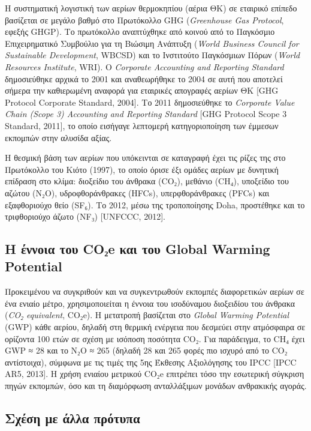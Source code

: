 Η συστηματική λογιστική των αερίων θερμοκηπίου (αέρια ΘΚ) σε εταιρικό
επίπεδο βασίζεται σε μεγάλο βαθμό στο Πρωτόκολλο GHG (\emph{Greenhouse
Gas Protocol}, εφεξής GHGP). Το πρωτόκολλο αναπτύχθηκε από κοινού από το
Παγκόσμιο Επιχειρηματικό Συμβούλιο για τη Βιώσιμη Ανάπτυξη (\emph{World
Business Council for Sustainable Development}, WBCSD) και το Ινστιτούτο
Παγκόσμιων Πόρων (\emph{World Resources Institute}, WRI). Ο
\emph{Corporate Accounting and Reporting Standard} δημοσιεύθηκε αρχικά
το 2001 και αναθεωρήθηκε το 2004 σε αυτή που αποτελεί σήμερα την
καθιερωμένη αναφορά για εταιρικές απογραφές αερίων ΘΚ {[}GHG Protocol
Corporate Standard, 2004{]}. Το 2011 δημοσιεύθηκε το \emph{Corporate
Value Chain (Scope 3) Accounting and Reporting Standard} {[}GHG Protocol
Scope 3 Standard, 2011{]}, το οποίο εισήγαγε λεπτομερή κατηγοριοποίηση
των έμμεσων εκπομπών στην αλυσίδα αξίας.

Η θεσμική βάση των αερίων που υπόκεινται σε καταγραφή έχει τις ρίζες της
στο Πρωτόκολλο του Κιότο (1997), το οποίο όρισε έξι ομάδες αερίων με
δυνητική επίδραση στο κλίμα: διοξείδιο του άνθρακα (CO₂), μεθάνιο (CH₄),
υποξείδιο του αζώτου (N₂O), υδροφθοράνθρακες (HFCs), υπερφθοράνθρακες
(PFCs) και εξαφθοριούχο θείο (SF₆). Το 2012, μέσω της τροποποίησης Doha,
προστέθηκε και το τριφθοριούχο άζωτο (NF₃) {[}UNFCCC, 2012{]}.

\subsection{Η έννοια του CO₂e και του Global Warming
Potential}\label{ux3b7-ux3adux3bdux3bdux3bfux3b9ux3b1-ux3c4ux3bfux3c5-coux2082e-ux3baux3b1ux3b9-ux3c4ux3bfux3c5-global-warming-potential}

Προκειμένου να συγκριθούν και να συγκεντρωθούν εκπομπές διαφορετικών
αερίων σε ένα ενιαίο μέτρο, χρησιμοποιείται η έννοια του ισοδύναμου
διοξειδίου του άνθρακα (\emph{CO₂ equivalent}, CO₂e). Η μετατροπή
βασίζεται στο \emph{Global Warming Potential} (GWP) κάθε αερίου, δηλαδή
στη θερμική ενέργεια που δεσμεύει στην ατμόσφαιρα σε ορίζοντα 100 ετών
σε σχέση με ισόποση ποσότητα CO₂. Για παράδειγμα, το CH₄ έχει GWP ≈ 28
και το N₂O ≈ 265 (δηλαδή 28 και 265 φορές πιο ισχυρό από το CO₂
αντίστοιχα), σύμφωνα με τις τιμές της 5ης Έκθεσης Αξιολόγησης του IPCC
{[}IPCC AR5, 2013{]}. Η χρήση ενιαίου μετρικού CO₂e επιτρέπει τόσο την
εσωτερική σύγκριση πηγών εκπομπών, όσο και τη διαμόρφωση ανταλλάξιμων
μονάδων ανθρακικής αγοράς.

\subsection{Σχέση με άλλα
πρότυπα}\label{ux3c3ux3c7ux3adux3c3ux3b7-ux3bcux3b5-ux3acux3bbux3bbux3b1-ux3c0ux3c1ux3ccux3c4ux3c5ux3c0ux3b1}

